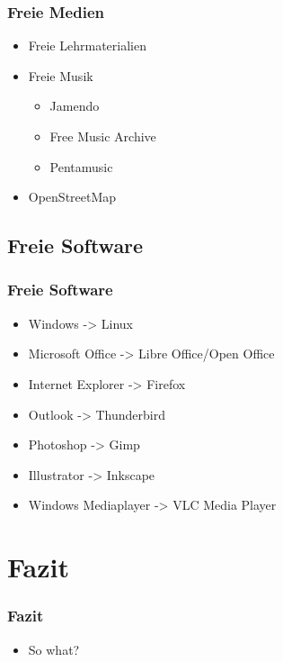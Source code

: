 \documentclass{beamer}
\begin{document}
\begin{frame}
  \frametitle{Freie Medien}
  \begin{itemize}
    \item<1-> Freie Lehrmaterialien
    \item<2-> Freie Musik
      \begin{itemize}
        \item Jamendo
        \item Free Music Archive
        \item Pentamusic
      \end{itemize}
    \item<3-> OpenStreetMap
  \end{itemize}
\end{frame}

\subsection{Freie Software}

\begin{frame}
  \frametitle{Freie Software}
  \begin{itemize}
    \item Windows -> Linux
    \item Microsoft Office -> Libre Office/Open Office
    \item Internet Explorer -> Firefox
    \item Outlook -> Thunderbird
    \item Photoshop -> Gimp
    \item Illustrator -> Inkscape
    \item Windows Mediaplayer -> VLC Media Player
  \end{itemize}
\end{frame}

\section{Fazit}

\begin{frame}
  \frametitle{Fazit}
  \begin{itemize}
    \item So what?
  \end{itemize}
\end{frame}
\end{document}
